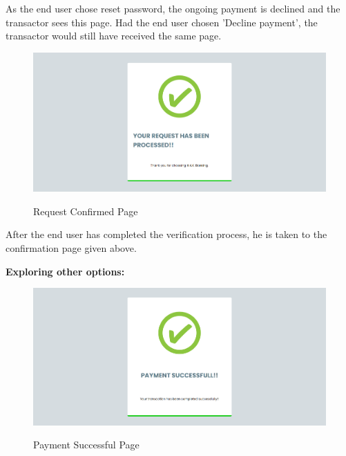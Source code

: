\documentclass[12pt, oneside, a4paper]{article}
\begin{document}
As the end user chose reset password, the ongoing payment is declined and the transactor sees this page. Had the end user chosen 'Decline payment', the transactor would still have received the same page.

\vspace{0.7cm}

\begin{figure}[H]
\begin{center}
\includegraphics[width=1\textwidth]{Confirmed.png}\\
\caption{Request Confirmed Page}
\label{fig:Figure 14}
\end{center}
\end{figure}

After the end user has completed the verification process, he is taken to the confirmation page given above.

\pagebreak

\textbf{Exploring other options:}

\begin{figure}[H]
\begin{center}
\includegraphics[width=1\textwidth]{Successful.png}\\
\caption{Payment Successful Page}
\label{fig:Figure 15}
\end{center}
\end{figure}
\end{document}
